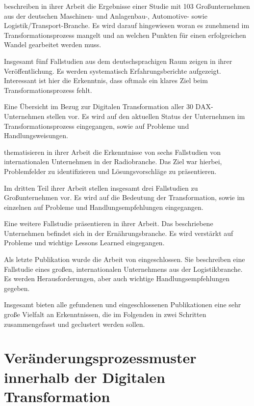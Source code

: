  beschreiben in ihrer Arbeit die Ergebnisse einer Studie mit 103 Großunternehmen aus der deutschen Maschinen- und Anlagenbau-, Automotive- sowie Logistik/Transport-Branche. Es wird darauf hingewiesen woran es zunehmend im Transformationsprozess mangelt und an welchen Punkten für einen erfolgreichen Wandel gearbeitet werden muss.

Insgesamt fünf Fallstudien aus dem deutschsprachigen Raum zeigen  in ihrer Veröffentlichung. Es werden systematisch Erfahrungsberichte aufgezeigt. Interessant ist hier die Erkenntnis, dass oftmals ein klares  Ziel beim Transformationsprozess fehlt.

Eine Übersicht im Bezug zur Digitalen Transformation aller 30 DAX-Unternehmen stellen  vor. Es wird auf den aktuellen Status der Unternehmen im Transformationsprozess eingegangen, sowie  auf  Probleme und Handlungsweisungen.

 thematisieren in ihrer  Arbeit die Erkenntnisse von sechs Fallstudien von internationalen Unternehmen in der Radiobranche. Das Ziel war hierbei, Problemfelder zu identifizieren und Lösungsvorschläge zu präsentieren.

Im dritten Teil ihrer Arbeit stellen  insgesamt drei  Fallstudien zu Großunternehmen vor. Es wird  auf die Bedeutung der Transformation, sowie im einzelnen auf Probleme und Handlungsempfehlungen eingegangen.

Eine weitere Fallstudie präsentieren  in ihrer Arbeit. Das beschriebene Unternehmen befindet sich in der Ernährungsbranche. Es wird verstärkt auf Probleme und wichtige Lessons Learned eingegangen.

Als letzte Publikation wurde die Arbeit von  eingeschlossen. Sie beschreiben eine Fallstudie eines großen, internationalen Unternehmens aus der Logistikbranche. Es werden Herausforderungen, aber auch wichtige Handlungsempfehlungen gegeben.

Insgesamt bieten alle gefundenen und eingeschlossenen Publikationen eine sehr große Vielfalt an Erkenntnissen, die im Folgenden in zwei Schritten zusammengefasst und geclustert werden sollen.

\section{Veränderungsprozessmuster innerhalb der Digitalen Transformation}
\label{problemfields:changepatterns}

